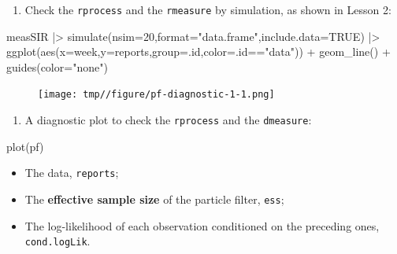 \documentclass[
  letterpaper,
  DIV=11,
  numbers=noendperiod]{scrartcl}
\newenvironment{Shaded}{\begin{snugshade}}{\end{snugshade}}
\newcommand{\AttributeTok}[1]{\textcolor[rgb]{0.40,0.45,0.13}{#1}}
\newcommand{\ConstantTok}[1]{\textcolor[rgb]{0.56,0.35,0.01}{#1}}
\newcommand{\DecValTok}[1]{\textcolor[rgb]{0.68,0.00,0.00}{#1}}
\newcommand{\FunctionTok}[1]{\textcolor[rgb]{0.28,0.35,0.67}{#1}}
\newcommand{\NormalTok}[1]{\textcolor[rgb]{0.00,0.23,0.31}{#1}}
\newcommand{\SpecialCharTok}[1]{\textcolor[rgb]{0.37,0.37,0.37}{#1}}
\newcommand{\StringTok}[1]{\textcolor[rgb]{0.13,0.47,0.30}{#1}}
\providecommand{\tightlist}{%
  \setlength{\itemsep}{0pt}\setlength{\parskip}{0pt}}\usepackage{longtable,booktabs,array}
\begin{document}
\begin{enumerate}
\def\labelenumi{\arabic{enumi}.}
\tightlist
\item
  Check the \texttt{rprocess} and the \texttt{rmeasure} by simulation,
  as shown in Lesson 2:
\end{enumerate}

\begin{Shaded}
\begin{Highlighting}[]
\NormalTok{measSIR }\SpecialCharTok{|\textgreater{}}
  \FunctionTok{simulate}\NormalTok{(}\AttributeTok{nsim=}\DecValTok{20}\NormalTok{,}\AttributeTok{format=}\StringTok{"data.frame"}\NormalTok{,}\AttributeTok{include.data=}\ConstantTok{TRUE}\NormalTok{) }\SpecialCharTok{|\textgreater{}}
  \FunctionTok{ggplot}\NormalTok{(}\FunctionTok{aes}\NormalTok{(}\AttributeTok{x=}\NormalTok{week,}\AttributeTok{y=}\NormalTok{reports,}\AttributeTok{group=}\NormalTok{.id,}\AttributeTok{color=}\NormalTok{.id}\SpecialCharTok{==}\StringTok{"data"}\NormalTok{)) }\SpecialCharTok{+}
  \FunctionTok{geom\_line}\NormalTok{() }\SpecialCharTok{+} \FunctionTok{guides}\NormalTok{(}\AttributeTok{color=}\StringTok{"none"}\NormalTok{)}
\end{Highlighting}
\end{Shaded}

\begin{figure}[h!]

{\centering \texttt{[image: tmp//figure/pf-diagnostic-1-1.png]}

}

\end{figure}

\framebreak

\begin{enumerate}
\def\labelenumi{\arabic{enumi}.}
\setcounter{enumi}{1}
\tightlist
\item
  A diagnostic plot to check the \texttt{rprocess} and the
  \texttt{dmeasure}:
\end{enumerate}

\begin{Shaded}
\begin{Highlighting}[]
\FunctionTok{plot}\NormalTok{(pf)}
\end{Highlighting}
\end{Shaded}

\begin{itemize}
\item
  The data, \texttt{reports};
\item
  The \textbf{effective sample size} of the particle filter,
  \texttt{ess};
\item
  The log-likelihood of each observation conditioned on the preceding
  ones, \texttt{cond.logLik}.
\end{itemize}
\end{document}
